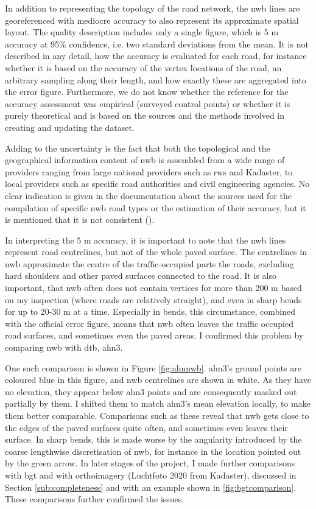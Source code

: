In addition to representing the topology of the road network, the \ac{nwb} lines are georeferenced with mediocre accuracy to also represent its approximate spatial layout. The quality description includes only a single figure, which is 5 m accuracy at 95\% confidence, i.e. two standard deviations from the mean. It is not described in any detail, how the accuracy is evaluated for each road, for instance whether it is based on the accuracy of the vertex locations of the road, an arbitrary sampling along their length, and how exactly these are aggregated into the error figure. Furthermore, we do not know whether the reference for the accuracy assessment was empirical (surveyed control points) or whether it is purely theoretical and is based on the sources and the methods involved in creating and updating the dataset.

Adding to the uncertainty is the fact that both the topological and the geographical information content of \ac{nwb} is assembled from a wide range of providers ranging from large national providers such as \ac{rws} and Kadaster, to local providers such as specific road authorities and civil engineering agencies. No clear indication is given in the documentation about the sources used for the compilation of specific \ac{nwb} road types or the estimation of their accuracy, but it is mentioned that it is not consistent (\cite{nwb_docs}).

In interpreting the 5 m accuracy, it is important to note that the \ac{nwb} lines represent road centrelines, but not of the whole paved surface. The centrelines in \ac{nwb} approximate the centre of the traffic-occupied parts the roads, excluding hard shoulders and other paved surfaces connected to the road. It is also important, that \ac{nwb} often does not contain vertices for more than 200 m based on my inspection (where roads are relatively straight), and even in sharp bends for up to 20-30 m at a time. Especially in bends, this circumstance, combined with the official error figure, means that \ac{nwb} often leaves the traffic occupied road surfaces, and sometimes even the paved areas. I confirmed this problem by comparing \ac{nwb} with \ac{dtb}, \ac{ahn3}.

One such comparison is shown in Figure \ref{fig:ahnnwb}. \ac{ahn3}'s ground points are coloured blue in this figure, and \ac{nwb} centrelines are shown in white. As they have no elevation, they appear below \ac{ahn3} points and are consequently masked out partially by them. I shifted them to match \ac{ahn3}'s mean elevation locally, to make them better comparable. Comparisons such as these reveal that \ac{nwb} gets close to the edges of the paved surfaces quite often, and sometimes even leaves their surface. In sharp bends, this is made worse by the angularity introduced by the coarse lengthwise discretisation of \ac{nwb}, for instance in the location pointed out by the green arrow. In later stages of the project, I made further comparisons with \ac{bgt} and with orthoimagery (Luchtfoto 2020 from Kadaster), discussed in Section \ref{sub:completeness} and with an example shown in \ref{fig:bgtcomparison}. These comparisons further confirmed the issues.

